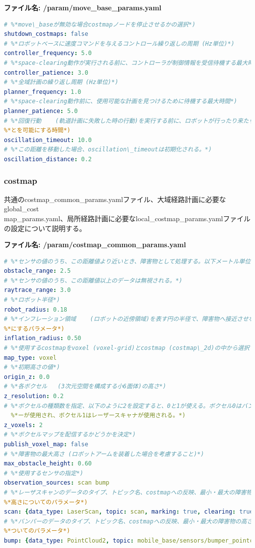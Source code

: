 \textbf{ファイル名: /param/move\_base\_params.yaml}
\begin{lstlisting}[language=YAML]
# %*move\_baseが無効な場合costmapノードを停止させるかの選択*)
shutdown_costmaps: false
# %*ロボットベースに速度コマンドを与えるコントロール繰り返しの周期 (Hz単位)*)
controller_frequency: 5.0
# %*space-clearing動作が実行される前に、コントローラが制御情報を受信待機する最大時間*)
controller_patience: 3.0
# %*全域計画の繰り返し周期 (Hz単位)*)
planner_frequency: 1.0
# %*space-clearing動作前に、使用可能な計画を見つけるために待機する最大時間*)
planner_patience: 5.0
# %*回復行動    (軌道計画に失敗した時の行動)を実行する前に、ロボットが行ったり来たりするこ*)
%*とを可能にする時間*)
oscillation_timeout: 10.0
# %*この距離を移動した場合、oscillation\_timeoutは初期化される。*)
oscillation_distance: 0.2
\end{lstlisting}

\subsubsection{costmap}

共通のcostmap\_common\_params.yamlファイル、大域経路計画に必要なglobal\_cost\\map\_params.yaml、局所経路計画に必要なlocal\_costmap\_params.yamlファイルの設定について説明する。

\textbf{ファイル名: /param/costmap\_common\_params.yaml}
\begin{lstlisting}[language=YAML]
# %*センサの値のうち、この距離値より近いとき、障害物として処理する。以下メートル単位*)
obstacle_range: 2.5
# %*センサの値のうち、この距離値以上のデータは無視される。*)
raytrace_range: 3.0
# %*ロボット半径*)
robot_radius: 0.18
# %*インフレーション領域    (ロボットの近傍領域)を表す円の半径で、障害物へ接近させないよう*)
%*にするパラメータ*)
inflation_radius: 0.50
# %*使用するcostmapをvoxel (voxel-grid)とcostmap (costmap\_2d)の中から選択する。*)
map_type: voxel
# %*初期高さの値*)
origin_z: 0.0
# %*各ボクセル   (3次元空間を構成する小6面体)の高さ*)
z_resolution: 0.2
# %*ボクセルの種類数を指定、以下のように2を設定すると、0と1が使える。ボクセル0はバンパ*)
  %*ーが使用され、ボクセル1はレーザースキャナが使用される。*)
z_voxels: 2
# %*ボクセルマップを配信するかどうかを決定*)
publish_voxel_map: false
# %*障害物の最大高さ (ロボットアームを装着した場合を考慮すること)*)
max_obstacle_height: 0.60
# %*使用するセンサの指定*)
observation_sources: scan bump
# %*レーザスキャンのデータのタイプ、トピック名、costmapへの反映、最小・最大の障害物の*)
%*高さについてのパラメータ*)
scan: {data_type: LaserScan, topic: scan, marking: true, clearing: true, min_obstacle_height: 0.25, max_obstacle_height: 0.35}
# %*バンパーのデータのタイプ、トピック名、costmapへの反映、最小・最大の障害物の高さに*)
%*ついてのパラメータ*)
bump: {data_type: PointCloud2, topic: mobile_base/sensors/bumper_pointcloud, marking: true, clearing: false, min_obstacle_height: 0.0, max_obstacle_height: 0.15}
\end{lstlisting}

